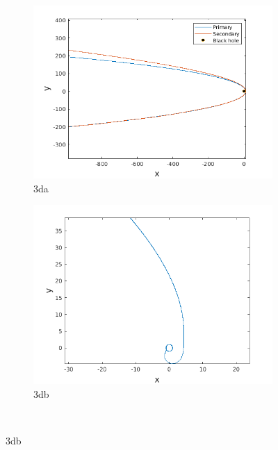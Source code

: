 \documentclass[a4paper]{article}
\begin{document}
			\begin{figure}
				\begin{subfigure} {.5\columnwidth}
					\includegraphics[width=\columnwidth]{../plots/3d_orbitsdisruption_equalaxes.png}
					\caption{3da}
					\label{fig:3da}
				\end{subfigure}
				\hfill
				\begin{subfigure} {.5\columnwidth}
					\includegraphics[width=\columnwidth]{../plots/3d_secondaryorbitdisruption_equalaxes.png}
					\caption{3db}
					\label{fig:3db}
				\end{subfigure}\\
				

\end{figure}
\end{document}
